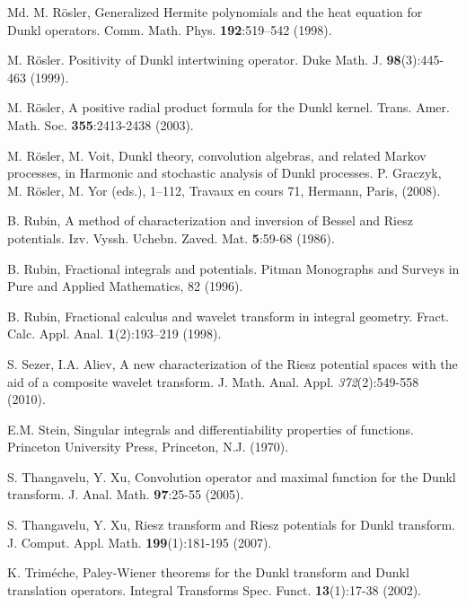 \documentclass[11pt,a4paper,reqno]{amsproc}
\theoremstyle{definition}
\theoremstyle{remark}
\numberwithin{equation}{section}
\begin{document}
\begin{thebibliography}{Md.}
M. R\"osler, Generalized Hermite polynomials and the heat equation for Dunkl operators. Comm. Math. Phys. \textbf{192}:519–542 (1998).

 M. R\"osler. Positivity of Dunkl intertwining operator. Duke Math. J. \textbf{98}(3):445-463 (1999).

M. R\"osler,  A positive radial product formula for the Dunkl kernel. Trans. Amer. Math. Soc. \textbf{355}:2413-2438 (2003). 

M. R\"osler,  M. Voit,  Dunkl theory, convolution algebras, and related Markov processes, in Harmonic and stochastic analysis of Dunkl processes. P. Graczyk, M. R\"osler, M. Yor (eds.), 1–112, Travaux en cours 71, Hermann, Paris, (2008).

B. Rubin,  A method of characterization and inversion of Bessel and Riesz potentials.  Izv. Vyssh. Uchebn. Zaved. Mat. \textbf{5}:59-68 (1986).

 B. Rubin,  Fractional integrals and potentials. Pitman Monographs and Surveys in Pure and Applied Mathematics, 82 (1996).

 B. Rubin, Fractional calculus and wavelet transform in integral geometry. Fract. Calc. Appl. Anal. \textbf{1}(2):193–219 (1998).


 S. Sezer, I.A. Aliev, A new characterization of the Riesz potential spaces with the aid of a composite wavelet transform. J. Math. Anal. Appl. \textit{372}(2):549-558 (2010).

E.M. Stein, Singular integrals and differentiability properties of functions. Princeton University Press, Princeton, N.J. (1970).

 S. Thangavelu, Y. Xu, Convolution operator and maximal function for the Dunkl transform. J. Anal. Math. \textbf{97}:25-55 (2005).

 S. Thangavelu, Y. Xu,  Riesz transform and Riesz potentials for Dunkl transform. J. Comput. Appl. Math. \textbf{199}(1):181-195 (2007).

K. Trim\'eche,  Paley-Wiener theorems for the Dunkl transform and Dunkl translation operators. Integral Transforms Spec. Funct. \textbf{13}(1):17-38 (2002).
\end{thebibliography} 
\end{document}
